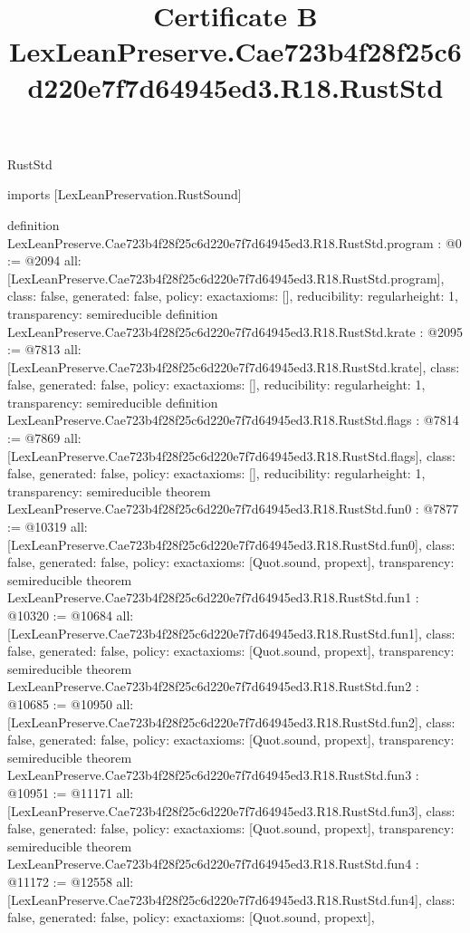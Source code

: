 \begin{lexlean}{RustStd}
\title{Certificate B LexLeanPreserve.Cae723b4f28f25c6d220e7f7d64945ed3.R18.RustStd}
\begin{coremodule}
imports [LexLeanPreservation.RustSound]

definition LexLeanPreserve.Cae723b4f28f25c6d220e7f7d64945ed3.R18.RustStd.program : @0 := @2094 {
  all: [LexLeanPreserve.Cae723b4f28f25c6d220e7f7d64945ed3.R18.RustStd.program],
  class: false,
  generated: false,
  policy: exact{axioms: []},
  reducibility: regular{height: 1},
  transparency: semireducible
}
definition LexLeanPreserve.Cae723b4f28f25c6d220e7f7d64945ed3.R18.RustStd.krate : @2095 := @7813 {
  all: [LexLeanPreserve.Cae723b4f28f25c6d220e7f7d64945ed3.R18.RustStd.krate],
  class: false,
  generated: false,
  policy: exact{axioms: []},
  reducibility: regular{height: 1},
  transparency: semireducible
}
definition LexLeanPreserve.Cae723b4f28f25c6d220e7f7d64945ed3.R18.RustStd.flags : @7814 := @7869 {
  all: [LexLeanPreserve.Cae723b4f28f25c6d220e7f7d64945ed3.R18.RustStd.flags],
  class: false,
  generated: false,
  policy: exact{axioms: []},
  reducibility: regular{height: 1},
  transparency: semireducible
}
theorem LexLeanPreserve.Cae723b4f28f25c6d220e7f7d64945ed3.R18.RustStd.fun0 : @7877 := @10319 {
  all: [LexLeanPreserve.Cae723b4f28f25c6d220e7f7d64945ed3.R18.RustStd.fun0],
  class: false,
  generated: false,
  policy: exact{axioms: [Quot.sound, propext]},
  transparency: semireducible
}
theorem LexLeanPreserve.Cae723b4f28f25c6d220e7f7d64945ed3.R18.RustStd.fun1 : @10320 := @10684 {
  all: [LexLeanPreserve.Cae723b4f28f25c6d220e7f7d64945ed3.R18.RustStd.fun1],
  class: false,
  generated: false,
  policy: exact{axioms: [Quot.sound, propext]},
  transparency: semireducible
}
theorem LexLeanPreserve.Cae723b4f28f25c6d220e7f7d64945ed3.R18.RustStd.fun2 : @10685 := @10950 {
  all: [LexLeanPreserve.Cae723b4f28f25c6d220e7f7d64945ed3.R18.RustStd.fun2],
  class: false,
  generated: false,
  policy: exact{axioms: [Quot.sound, propext]},
  transparency: semireducible
}
theorem LexLeanPreserve.Cae723b4f28f25c6d220e7f7d64945ed3.R18.RustStd.fun3 : @10951 := @11171 {
  all: [LexLeanPreserve.Cae723b4f28f25c6d220e7f7d64945ed3.R18.RustStd.fun3],
  class: false,
  generated: false,
  policy: exact{axioms: [Quot.sound, propext]},
  transparency: semireducible
}
theorem LexLeanPreserve.Cae723b4f28f25c6d220e7f7d64945ed3.R18.RustStd.fun4 : @11172 := @12558 {
  all: [LexLeanPreserve.Cae723b4f28f25c6d220e7f7d64945ed3.R18.RustStd.fun4],
  class: false,
  generated: false,
  policy: exact{axioms: [Quot.sound, propext]},
}
\end{coremodule}
\end{lexlean}
